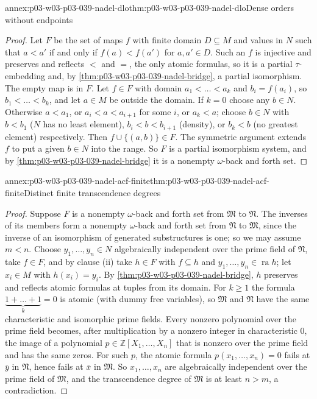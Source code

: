 \begin{annexitem}{annex:p03-w03-p03-039-nadel-dlo}{thm:p03-w03-p03-039-nadel-dlo}{Dense orders without endpoints}
\begin{proof}
Let \(F\) be the set of maps \(f\) with finite domain \(D\subseteq M\) and
values in \(N\) such that \(a<a'\) if and only if \(f(a)<f(a')\) for
\(a,a'\in D\). Such an \(f\) is injective and preserves and reflects \(<\)
and \(=\), the only atomic formulas, so it is a partial \(\tau\)-embedding and,
by \cref{thm:p03-w03-p03-039-nadel-bridge}, a partial isomorphism. The
empty map is in \(F\). Let \(f\in F\) with domain
\(a_1<\dots<a_k\) and \(b_i=f(a_i)\), so \(b_1<\dots<b_k\), and let \(a\in M\)
be outside the domain. If \(k=0\) choose any \(b\in N\). Otherwise \(a<a_1\),
or \(a_i<a<a_{i+1}\) for some \(i\), or \(a_k<a\); choose \(b\in N\) with
\(b<b_1\) (\(N\) has no least element), \(b_i<b<b_{i+1}\) (density), or
\(b_k<b\) (no greatest element) respectively. Then
\(f\cup\{(a,b)\}\in F\). The symmetric argument extends \(f\) to put a given
\(b\in N\) into the range. So \(F\) is a partial isomorphism system, and by
\cref{thm:p03-w03-p03-039-nadel-bridge} it is a nonempty \(\omega\)-back and
forth set.
\end{proof}
\end{annexitem}

\begin{annexitem}{annex:p03-w03-p03-039-nadel-acf-finite}{thm:p03-w03-p03-039-nadel-acf-finite}{Distinct finite transcendence degrees}
\begin{proof}
Suppose \(F\) is a nonempty \(\omega\)-back and forth set from \(\mathfrak M\)
to \(\mathfrak N\). The inverses of its members form a nonempty
\(\omega\)-back and forth set from \(\mathfrak N\) to \(\mathfrak M\), since
the inverse of an isomorphism of generated substructures is one; so we may
assume \(m<n\). Choose \(y_1,\dots,y_n\in N\) algebraically independent over
the prime field of \(\mathfrak N\), take \(f\in F\), and by clause (ii) take
\(h\in F\) with \(f\subseteq h\) and \(y_1,\dots,y_n\in\operatorname{ra}h\);
let \(x_i\in M\) with \(h(x_i)=y_i\). By
\cref{thm:p03-w03-p03-039-nadel-bridge}, \(h\) preserves and reflects atomic
formulas at tuples from its domain. For \(k\ge1\) the formula
\(\underbrace{1+\dots+1}_{k}=0\) is atomic (with dummy free variables), so
\(\mathfrak M\) and \(\mathfrak N\) have the same characteristic and
isomorphic prime fields. Every nonzero polynomial over the prime field
becomes, after multiplication by a nonzero integer in characteristic
\(0\), the image of a polynomial \(p\in\mathbb Z[X_1,\dots,X_n]\) that is
nonzero over the prime field and has the same zeros. For such \(p\), the
atomic formula \(p(x_1,\dots,x_n)=0\) fails at \(\bar y\) in \(\mathfrak N\),
hence fails at \(\bar x\) in \(\mathfrak M\). So \(x_1,\dots,x_n\) are
algebraically independent over the prime field of \(\mathfrak M\), and the
transcendence degree of \(\mathfrak M\) is at least \(n>m\), a
contradiction.
\end{proof}
\end{annexitem}

